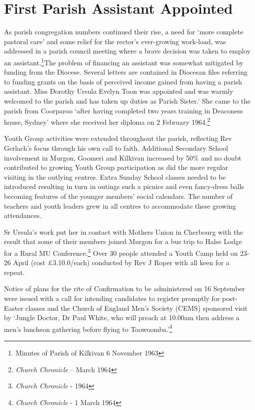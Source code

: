 \section{First Parish Assistant
Appointed}

As parish congregation numbers continued their rise, a need for `more
complete pastoral care' and some relief for the rector's ever-growing
work-load, was addressed in a parish council meeting where a brave
decision was taken to employ an assistant.\footnote{Minutes of Parish of
  Kilkivan 6 November 1963}The problem of financing an assistant was
somewhat mitigated by funding from the Diocese. Several letters are
contained in Diocesan files referring to funding grants on the basis of
perceived income gained from having a parish assistant. Miss Dorothy
Ursula Evelyn Toon was appointed and was warmly welcomed to the parish
and has taken up duties as Parish Sister.' She came to the parish from
Coorparoo `after having completed two years training in Deaconess house,
Sydney' where she received her diploma on 2 February 1964.\footnote{\emph{Church
  Chronicle} -- March 1964}

Youth Group activities were extended throughout the parish, reflecting
Rev Gerlach's focus through his own call to faith. Additional Secondary
School involvement in Murgon, Goomeri and Kilkivan increased by 50\% and
no doubt contributed to growing Youth Group participation as did the
more regular visiting in the outlying centres. Extra Sunday School
classes needed to be introduced resulting in turn in outings such a
picnics and even fancy-dress balls becoming features of the younger
members' social calendars. The number of teachers and youth leaders grew
in all centres to accommodate these growing attendances.

Sr Ursula's work put her in contact with Mothers Union in Cherbourg with
the result that some of their members joined Murgon for a bus trip to
Halse Lodge for a Rural MU Conference.\footnote{\emph{Church Chronicle}
  - 1964} Over 30 people attended a Youth Camp held on 23-26 April (cost
\pounds3.10.0/each) conducted by Rev J Roper with all keen for a repeat.

Notice of plans for the rite of Confirmation to be administered on 16
September were issued with a call for intending candidates to register
promptly for post-Easter classes and the Church of England Men's Society
(CEMS) sponsored visit by `Jungle Doctor, Dr Paul White, who will preach
at 10.00am then address a men's luncheon gathering before flying to
Toowoomba.'\footnote{\emph{Church Chronicle} - 1 March 1964}

